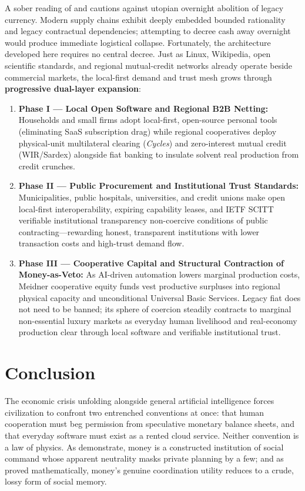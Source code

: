 \documentclass[11pt]{article}
\begin{document}
A sober reading of \citet{mason2026against} and \citet{polanyi1944great} cautions against utopian overnight abolition of legacy currency. Modern supply chains exhibit deeply embedded bounded rationality and legacy contractual dependencies; attempting to decree cash away overnight would produce immediate logistical collapse. Fortunately, the architecture developed here requires no central decree. Just as Linux, Wikipedia, open scientific standards, and regional mutual-credit networks already operate beside commercial markets, the local-first demand and trust mesh grows through \textbf{progressive dual-layer expansion}:
\begin{enumerate}
  \item \textbf{Phase I --- Local Open Software and Regional B2B Netting:} Households and small firms adopt local-first, open-source personal tools (eliminating SaaS subscription drag) while regional cooperatives deploy physical-unit multilateral clearing (\emph{Cycles}) and zero-interest mutual credit (WIR/Sardex) alongside fiat banking to insulate solvent real production from credit crunches.
  \item \textbf{Phase II --- Public Procurement and Institutional Trust Standards:} Municipalities, public hospitals, universities, and credit unions make open local-first interoperability, expiring capability leases, and IETF SCITT verifiable institutional transparency non-coercive conditions of public contracting---rewarding honest, transparent institutions with lower transaction costs and high-trust demand flow.
  \item \textbf{Phase III --- Cooperative Capital and Structural Contraction of Money-as-Veto:} As AI-driven automation lowers marginal production costs, Meidner cooperative equity funds vest productive surpluses into regional physical capacity and unconditional Universal Basic Services. Legacy fiat does not need to be banned; its sphere of coercion steadily contracts to marginal non-essential luxury markets as everyday human livelihood and real-economy production clear through local software and verifiable institutional trust.
\end{enumerate}

\section{Conclusion}\label{sec:conclusion}

The economic crisis unfolding alongside general artificial intelligence forces civilization to confront two entrenched conventions at once: that human cooperation must beg permission from speculative monetary balance sheets, and that everyday software must exist as a rented cloud service. Neither convention is a law of physics. As \citet{mason2026against} demonstrate, money is a constructed institution of social command whose apparent neutrality masks private planning by a few; and as \citet{kocherlakota1998memory} proved mathematically, money's genuine coordination utility reduces to a crude, lossy form of social memory.
\end{document}
